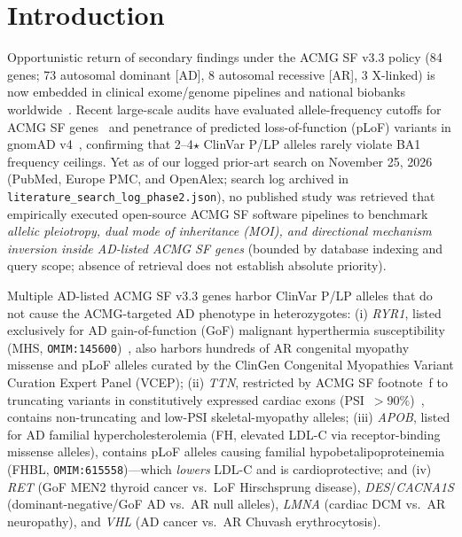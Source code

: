 \documentclass[11pt,letterpaper]{article}
\begin{document}
\begin{abstract}
high-PSI ($>90\%$) filtering, \texttt{OwnGenome} exhibits a 2.51-fold South Asian-to-European false-positive disparity at $\ge 80\%$ AN (4.10 vs.\ 1.63/1,000; model-free SAS lower bound 3.34/1,000 from \textit{RYR1} p.Arg3550Trp alone; 3.46-fold at $\ge 95\%$ AN). A validated four-layer downstream patch incorporating ClinGen \texttt{lof=no} ClinVar gating with AD Expert-Panel override (preserving NMD-escaping \textit{TNNT2} p.Trp297Ter) and SCV-level MOI filtering cuts benchmark false positives from 13--15/15 to 1/15 while retaining 100.0\% (1,533/1,533) of genuine 3$\star$ AD Expert-Panel alleles, motivating upstream ClinVar VCF \texttt{CLNMOI} emission.
\end{abstract}

\section{Introduction}
Opportunistic return of secondary findings under the ACMG SF v3.3 policy (84 genes; 73 autosomal dominant [AD], 8 autosomal recessive [AR], 3 X-linked) is now embedded in clinical exome/genome pipelines and national biobanks worldwide~\citep{lee2025acmgsf33,kerr2025viking}. Recent large-scale audits have evaluated allele-frequency cutoffs for ACMG SF genes~\citep{johnston2026daft} and penetrance of predicted loss-of-function (pLoF) variants in gnomAD v4~\citep{gudmundsson2025gnomad}, confirming that 2--4$\star$ ClinVar P/LP alleles rarely violate BA1 frequency ceilings. Yet as of our logged prior-art search on November 25, 2026 (PubMed, Europe PMC, and OpenAlex; search log archived in \texttt{literature\_search\_log\_phase2.json}), no published study was retrieved that empirically executed open-source ACMG SF software pipelines to benchmark \textit{allelic pleiotropy, dual mode of inheritance (MOI), and directional mechanism inversion inside AD-listed ACMG SF genes} (bounded by database indexing and query scope; absence of retrieval does not establish absolute priority).

Multiple AD-listed ACMG SF v3.3 genes harbor ClinVar P/LP alleles that do not cause the ACMG-targeted AD phenotype in heterozygotes: (i) \textit{RYR1}, listed exclusively for AD gain-of-function (GoF) malignant hyperthermia susceptibility (MHS, \texttt{OMIM:145600})~\citep{johnston2021ryr1vcep}, also harbors hundreds of AR congenital myopathy missense and pLoF alleles curated by the ClinGen Congenital Myopathies Variant Curation Expert Panel (VCEP); (ii) \textit{TTN}, restricted by ACMG SF footnote~f to truncating variants in constitutively expressed cardiac exons (PSI~$>90\%$)~\citep{roberts2015ttn,lee2025acmgsf33}, contains non-truncating and low-PSI skeletal-myopathy alleles; (iii) \textit{APOB}, listed for AD familial hypercholesterolemia (FH, elevated LDL-C via receptor-binding missense alleles), contains pLoF alleles causing familial hypobetalipoproteinemia (FHBL, \texttt{OMIM:615558})---which \emph{lowers} LDL-C and is cardioprotective; and (iv) \textit{RET} (GoF MEN2 thyroid cancer vs.\ LoF Hirschsprung disease), \textit{DES}/\textit{CACNA1S} (dominant-negative/GoF AD vs.\ AR null alleles), \textit{LMNA} (cardiac DCM vs.\ AR neuropathy), and \textit{VHL} (AD cancer vs.\ AR Chuvash erythrocytosis).
\end{document}
